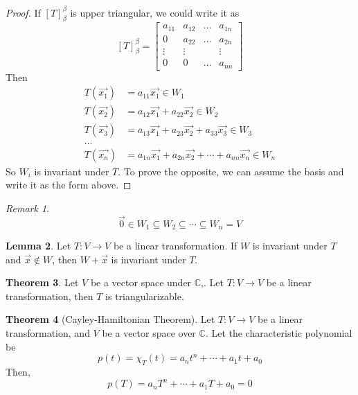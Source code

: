 \documentclass{article}
\theoremstyle{definition}
\newtheorem{theorem}{Theorem}[section]
\newtheorem{lemma}[theorem]{Lemma}
\theoremstyle{remark}
\newtheorem{remark}[theorem]{Remark}
\begin{document}
\begin{proof}
    If $[T]^{\beta}_{\beta}$ is upper triangular, we could write it as
    \[
    [T]^{\beta}_{\beta}=\begin{bmatrix}
        a_{11} & a_{12} & \dots & a_{1n}\\
        0 & a_{22} & \dots & a_{2n}\\
        \vdots & \vdots&&\vdots\\
        0 & 0 & \dots  & a_{nn}
    \end{bmatrix}
    \]
    Then 
    \[
    \begin{aligned}
        T(\vec{x_1})&=a_{11}\vec{x_1}\in W_1\\
        T(\vec{x_2})&=a_{12}\vec{x_1}+a_{22}\vec{x_2}\in W_2\\
        T(\vec{x_3})&=a_{13}\vec{x_1}+a_{23}\vec{x_2}+a_{33}\vec{x_3}\in W_3\\
        \dots&\\
        T(\vec{x_n})&=a_{1n}\vec{x_1}+a_{2n}\vec{x_2}+\cdots +a_{nn}\vec{x_n}\in W_n
    \end{aligned}
    \]
    So $W_i$ is invariant under $T$.
    To prove the opposite, we can assume the basis and write it as the form above.
\end{proof}

\begin{remark}
    \[
    \vec{0}\in W_1\subseteq W_2\subseteq \cdots\subseteq W_n=V
    \]
\end{remark}

\begin{lemma}
    Let $T:V\rightarrow V$ be a linear transformation. If $W$ is invariant under $T$ and $\vec{x}\not\in W$, then $W+\vec{x}$ is invariant under $T$.
\end{lemma}

\begin{theorem}
    Let $V$ be a vector space under $\mathbb{C}$,.
    Let $T:V\rightarrow V$ be a linear transformation, then $T$ is triangularizable.
\end{theorem}

\begin{theorem}[Cayley-Hamiltonian Theorem]
    Let $T:V\rightarrow V$ be a linear transformation, and $V$ be a vector space over $\mathbb{C}$. 
    Let the characteristic polynomial be 
    \[
    p(t)=\chi_T(t)=a_n t^n+\cdots+a_1 t+a_0
    \]
    Then,
    \[
    p(T)=a_n T^n+\cdots+a_1 T+a_0=0
    \]
\end{theorem}
\end{document}
